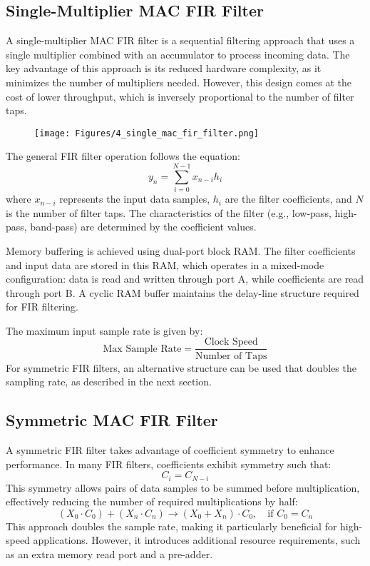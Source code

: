 \documentclass{article}
\begin{document}
	\subsection{Single-Multiplier MAC FIR Filter}
	A single-multiplier MAC FIR filter is a sequential filtering approach that uses a single multiplier combined with an accumulator to process incoming data. The key advantage of this approach is its reduced hardware complexity, as it minimizes the number of multipliers needed. However, this design comes at the cost of lower throughput, which is inversely proportional to the number of filter taps.
	
	\begin{figure}
		\centering
		\texttt{[image: Figures/4\_single\_mac\_fir\_filter.png]}
		\label{fig:enter-label}
	\end{figure}
	
	The general FIR filter operation follows the equation:
	\begin{equation}
		y_n = \sum_{i=0}^{N-1} x_{n-i} h_i
	\end{equation}
	where \( x_{n-i} \) represents the input data samples, \( h_i \) are the filter coefficients, and \( N \) is the number of filter taps. The characteristics of the filter (e.g., low-pass, high-pass, band-pass) are determined by the coefficient values.
	
	Memory buffering is achieved using dual-port block RAM. The filter coefficients and input data are stored in this RAM, which operates in a mixed-mode configuration: data is read and written through port A, while coefficients are read through port B. A cyclic RAM buffer maintains the delay-line structure required for FIR filtering.
	
	The maximum input sample rate is given by:
	\begin{equation}
		\text{Max Sample Rate} = \frac{\text{Clock Speed}}{\text{Number of Taps}}
	\end{equation}
	For symmetric FIR filters, an alternative structure can be used that doubles the sampling rate, as described in the next section.
	
	\subsection{Symmetric MAC FIR Filter}
	A symmetric FIR filter takes advantage of coefficient symmetry to enhance performance. In many FIR filters, coefficients exhibit symmetry such that:
	\begin{equation}
		C_i = C_{N-i}
	\end{equation}
	This symmetry allows pairs of data samples to be summed before multiplication, effectively reducing the number of required multiplications by half:
	\begin{equation}
		(X_0 \cdot C_0) + (X_n \cdot C_n) \rightarrow (X_0 + X_n) \cdot C_0, \quad \text{if } C_0 = C_n
	\end{equation}
	This approach doubles the sample rate, making it particularly beneficial for high-speed applications. However, it introduces additional resource requirements, such as an extra memory read port and a pre-adder.
	
\end{document}
